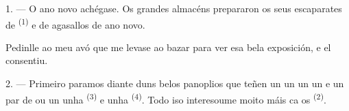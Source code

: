 %
%
%
%

\VUsaut{4.0mm}
\VUsaut{2.0mm}
\VUsaut{3.4mm}

1. --- O ano novo achégase. Os grandes almacéns prepararon os seus escaparates de
 \textsuperscript{(1)} e de agasallos de ano novo.

Pedinlle ao meu avó que me levase ao bazar para ver esa bela exposición, e el
consentiu.

2. --- Primeiro paramos diante duns belos panoplios que teñen un  un
 un  un  e un par de
 ou un  unha 
\textsuperscript{(3)} e unha  \textsuperscript{(4)}. Todo iso
interesoume moito máis ca os  \textsuperscript{(2)}.

\VUsaut{3.0mm}
\VUsaut{2.6mm}

